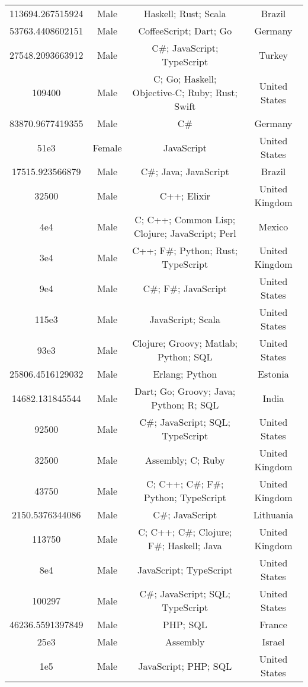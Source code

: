 \begin{center}
\begin{tabular}{ |c|c|c|c| }
113694.267515924  &  Male  &  Haskell; Rust; Scala  &  Brazil  \\ 
53763.4408602151  &  Male  &  CoffeeScript; Dart; Go  &  Germany  \\ 
27548.2093663912  &  Male  &  C\#; JavaScript; TypeScript  &  Turkey  \\ 
109400  &  Male  &  C; Go; Haskell; Objective-C; Ruby; Rust; Swift  &  United States  \\ 
83870.9677419355  &  Male  &  C\#  &  Germany  \\ 
51e3  &  Female  &  JavaScript  &  United States  \\ 
17515.923566879  &  Male  &  C\#; Java; JavaScript  &  Brazil  \\ 
32500  &  Male  &  C++; Elixir  &  United Kingdom  \\ 
4e4  &  Male  &  C; C++; Common Lisp; Clojure; JavaScript; Perl  &  Mexico  \\ 
3e4  &  Male  &  C++; F\#; Python; Rust; TypeScript  &  United Kingdom  \\ 
9e4  &  Male  &  C\#; F\#; JavaScript  &  United States  \\ 
115e3  &  Male  &  JavaScript; Scala  &  United States  \\ 
93e3  &  Male  &  Clojure; Groovy; Matlab; Python; SQL  &  United States  \\ 
25806.4516129032  &  Male  &  Erlang; Python  &  Estonia  \\ 
14682.131845544  &  Male  &  Dart; Go; Groovy; Java; Python; R; SQL  &  India  \\ 
92500  &  Male  &  C\#; JavaScript; SQL; TypeScript  &  United States  \\ 
32500  &  Male  &  Assembly; C; Ruby  &  United Kingdom  \\ 
43750  &  Male  &  C; C++; C\#; F\#; Python; TypeScript  &  United Kingdom  \\ 
2150.5376344086  &  Male  &  C\#; JavaScript  &  Lithuania  \\ 
113750  &  Male  &  C; C++; C\#; Clojure; F\#; Haskell; Java  &  United Kingdom  \\ 
8e4  &  Male  &  JavaScript; TypeScript  &  United States  \\ 
100297  &  Male  &  C\#; JavaScript; SQL; TypeScript  &  United States  \\ 
46236.5591397849  &  Male  &  PHP; SQL  &  France  \\ 
25e3  &  Male  &  Assembly  &  Israel  \\ 
1e5  &  Male  &  JavaScript; PHP; SQL  &  United States  \\ 

\end{tabular}
\end{center}
